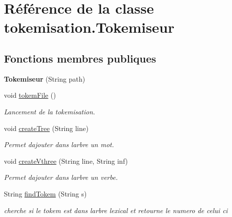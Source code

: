 \hypertarget{classtokemisation_1_1_tokemiseur}{}\section{Référence de la classe tokemisation.\+Tokemiseur}
\label{classtokemisation_1_1_tokemiseur}
\subsection*{Fonctions membres publiques}
\begin{DoxyCompactItemize}
\item 
{\bfseries Tokemiseur} (String path)\hypertarget{classtokemisation_1_1_tokemiseur_a0bedd0f61434a9597b87c674a52af8bf}{}\label{classtokemisation_1_1_tokemiseur_a0bedd0f61434a9597b87c674a52af8bf}

\item 
void \hyperlink{classtokemisation_1_1_tokemiseur_a1036e3bd17f10ac37b00142119495307}{tokem\+File} ()\hypertarget{classtokemisation_1_1_tokemiseur_a1036e3bd17f10ac37b00142119495307}{}\label{classtokemisation_1_1_tokemiseur_a1036e3bd17f10ac37b00142119495307}

\begin{DoxyCompactList}\small\item\em Lancement de la tokemisation. \end{DoxyCompactList}\item 
void \hyperlink{classtokemisation_1_1_tokemiseur_a9af268b22fd743447b689a27e0b0db3a}{create\+Tree} (String line)
\begin{DoxyCompactList}\small\item\em Permet d\textquotesingle{}ajouter dans l\textquotesingle{}arbre un mot. \end{DoxyCompactList}\item 
void \hyperlink{classtokemisation_1_1_tokemiseur_ae932be66d27c705438bb7e07036c2f52}{create\+Vthree} (String line, String inf)
\begin{DoxyCompactList}\small\item\em Permet d\textquotesingle{}ajouter dans l\textquotesingle{}arbre un verbe. \end{DoxyCompactList}\item 
String \hyperlink{classtokemisation_1_1_tokemiseur_a9aa1bbf145517a2b9b79461d8d831145}{find\+Tokem} (String s)
\begin{DoxyCompactList}\small\item\em cherche si le tokem est dans l\textquotesingle{}arbre lexical et retourne le numero de celui ci \end{DoxyCompactList}\end{DoxyCompactItemize}


